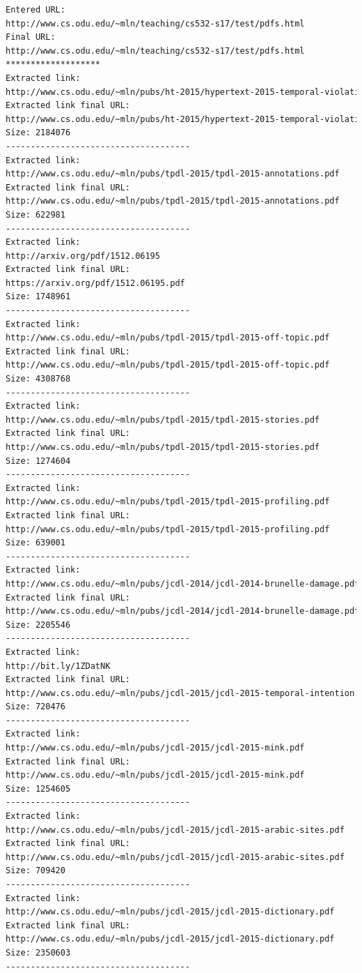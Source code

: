 \documentclass[a4paper, 11pt]{article}
\begin{document}
\begin{lstlisting}[language=bash,label=Output:,caption=Output:]
Entered URL:
http://www.cs.odu.edu/~mln/teaching/cs532-s17/test/pdfs.html
Final URL:
http://www.cs.odu.edu/~mln/teaching/cs532-s17/test/pdfs.html
*******************
Extracted link:
http://www.cs.odu.edu/~mln/pubs/ht-2015/hypertext-2015-temporal-violations.pdf
Extracted link final URL:
http://www.cs.odu.edu/~mln/pubs/ht-2015/hypertext-2015-temporal-violations.pdf
Size: 2184076
-------------------------------------
Extracted link:
http://www.cs.odu.edu/~mln/pubs/tpdl-2015/tpdl-2015-annotations.pdf
Extracted link final URL:
http://www.cs.odu.edu/~mln/pubs/tpdl-2015/tpdl-2015-annotations.pdf
Size: 622981
-------------------------------------
Extracted link:
http://arxiv.org/pdf/1512.06195
Extracted link final URL:
https://arxiv.org/pdf/1512.06195.pdf
Size: 1748961
-------------------------------------
Extracted link:
http://www.cs.odu.edu/~mln/pubs/tpdl-2015/tpdl-2015-off-topic.pdf
Extracted link final URL:
http://www.cs.odu.edu/~mln/pubs/tpdl-2015/tpdl-2015-off-topic.pdf
Size: 4308768
-------------------------------------
Extracted link:
http://www.cs.odu.edu/~mln/pubs/tpdl-2015/tpdl-2015-stories.pdf
Extracted link final URL:
http://www.cs.odu.edu/~mln/pubs/tpdl-2015/tpdl-2015-stories.pdf
Size: 1274604
-------------------------------------
Extracted link:
http://www.cs.odu.edu/~mln/pubs/tpdl-2015/tpdl-2015-profiling.pdf
Extracted link final URL:
http://www.cs.odu.edu/~mln/pubs/tpdl-2015/tpdl-2015-profiling.pdf
Size: 639001
-------------------------------------
Extracted link:
http://www.cs.odu.edu/~mln/pubs/jcdl-2014/jcdl-2014-brunelle-damage.pdf
Extracted link final URL:
http://www.cs.odu.edu/~mln/pubs/jcdl-2014/jcdl-2014-brunelle-damage.pdf
Size: 2205546
-------------------------------------
Extracted link:
http://bit.ly/1ZDatNK
Extracted link final URL:
http://www.cs.odu.edu/~mln/pubs/jcdl-2015/jcdl-2015-temporal-intention.pdf
Size: 720476
-------------------------------------
Extracted link:
http://www.cs.odu.edu/~mln/pubs/jcdl-2015/jcdl-2015-mink.pdf
Extracted link final URL:
http://www.cs.odu.edu/~mln/pubs/jcdl-2015/jcdl-2015-mink.pdf
Size: 1254605
-------------------------------------
Extracted link:
http://www.cs.odu.edu/~mln/pubs/jcdl-2015/jcdl-2015-arabic-sites.pdf
Extracted link final URL:
http://www.cs.odu.edu/~mln/pubs/jcdl-2015/jcdl-2015-arabic-sites.pdf
Size: 709420
-------------------------------------
Extracted link:
http://www.cs.odu.edu/~mln/pubs/jcdl-2015/jcdl-2015-dictionary.pdf
Extracted link final URL:
http://www.cs.odu.edu/~mln/pubs/jcdl-2015/jcdl-2015-dictionary.pdf
Size: 2350603
-------------------------------------
\end{lstlisting}
\end{document}
